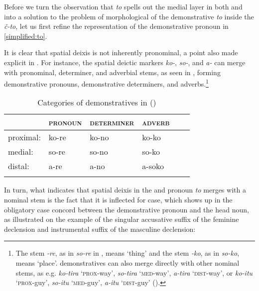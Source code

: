 \vskip 0.25cm
\noindent Before we turn the observation that \textit{to} spells out the medial layer in both  and  into a solution to the problem of morphological  of the demonstrative \textit{to} inside the  \textit{\v{c}-to}, let us first refine the representation of the demonstrative pronoun in \ref{simplified:to}.
\par
It is clear that spatial deixis is not inherently pronominal, a point also made explicit in \cite{Lander-Haegeman2016}. For instance, the  spatial deictic markers \textit{ko-}, \textit{so-}, and \textit{a-} can merge with pronominal, determiner, and adverbial stems, as seen in , forming demonstrative pronouns, demonstrative determiners, and  adverbs.\footnote{The stem \textit{-re}, as in \textit{so-re} in  , means `thing' and the stem \textit{-ko}, as in \textit{so-ko}, means `place'.  demonstratives can also merge directly with other nominal stems, as e.g. \textit{ko-tira} `\textsc{prox}-way', \textit{so-tira} `\textsc{med}-way', \textit{a-tira} `\textsc{dist}-way', or \textit{ko-itu} `\textsc{prox}-guy', \textit{so-itu} `\textsc{med}-guy', \textit{a-itu} `\textsc{dist}-guy' (\citealt[97]{Hoji-etal2003}). 
} %


\begin{table}
\caption{Categories of demonstratives in  (\citealt{Kuno1973})}
\label{Jap:stems} 
\begin{tabular}[t]{ l l l l l l }
\lsptoprule	
		& \textsc{pronoun} 	& \textsc{determiner} 	& \textsc{adverb}\\\hline
proximal:	& ko-re			& ko-no				& ko-ko\\
medial:	& so-re			& so-no				& so-ko\\
distal:	& a-re			& a-no				& a-soko\\
\lspbottomrule
\end{tabular}
\end{table}

\noindent In turn, what indicates that spatial deixis in the  and   pronoun \textit{to} merges with a nominal stem is the fact that it is inflected for case, which shows up in the obligatory case concord between the demonstrative pronoun and the head noun, as illustrated on the example of the  singular accusative suffix of the feminine declension and instrumental suffix of the masculine declension:

